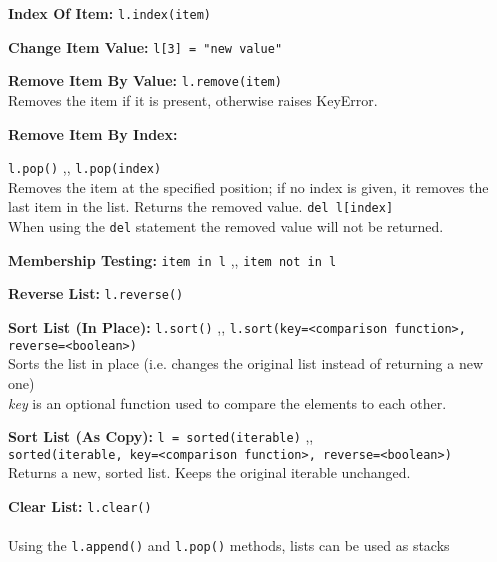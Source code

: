 \begin{indentblock}
            \textbf{Index Of Item:} \texttt{l.index(item)}

            \textbf{Change Item Value:} \texttt{l[3] = "new value"}

            \textbf{Remove Item By Value:} \texttt{l.remove(item)} \\
            Removes the item if it is present, otherwise raises KeyError.

            \textbf{Remove Item By Index:}
            \begin{itemize}
                 \texttt{l.pop()} \sep{,}
                \texttt{l.pop(index)} \\
                Removes the item at the specified position; if no index is given, it removes the last
                item in the list. Returns the removed value.
                 \texttt{del l[index]} \\
                When using the \texttt{del} statement the removed value will not be
                returned.
            \end{itemize}


            \textbf{Membership Testing:} \texttt{item in l} \sep{,}
            \texttt{item not in l}

            \textbf{Reverse List:} \texttt{l.reverse()}

            \textbf{Sort List (In Place):} \texttt{l.sort()} \sep{,}
            \texttt{l.sort(key=<comparison function>, reverse=<boolean>)} \\
            Sorts the list in place (i.e. changes the original list instead of returning a new one)\\
            \textit{key} is an optional function used to compare the elements to each other.

            \textbf{Sort List (As Copy):} \texttt{l = sorted(iterable)} \sep{,} \\
            \texttt{sorted(iterable, key=<comparison function>, reverse=<boolean>)} \\
            Returns a new, sorted list. Keeps the original iterable unchanged.

            \textbf{Clear List:} \texttt{l.clear()}
            \\ \\
            Using the \texttt{l.append()} and \texttt{l.pop()} methods, lists
            can be used as stacks

        \end{indentblock}

